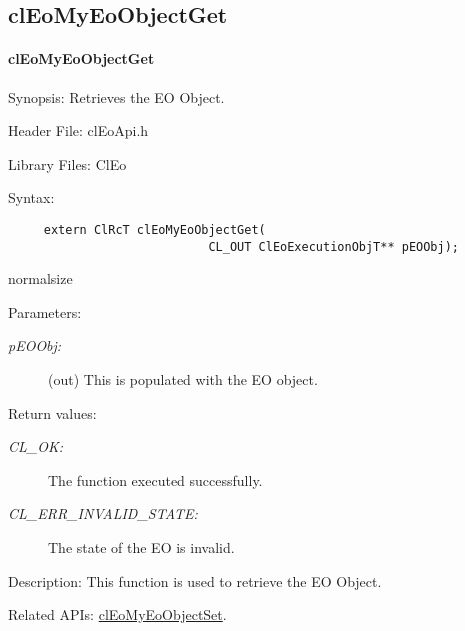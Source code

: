 \begin{flushleft}
  \newpage
\subsection{clEoMyEoObjectGet}
\hypertarget{pageeo119}{}\paragraph{cl\-Eo\-My\-Eo\-Object\-Get}\label{pageeo119}
\begin{Desc}
\item[Synopsis:]Retrieves the EO Object.\end{Desc}
\begin{Desc}
\item[Header File:]clEoApi.h\end{Desc}
\begin{Desc}
\item[Library Files:]Cl\-Eo\end{Desc}
\begin{Desc}
\item[Syntax:]

\footnotesize\begin{verbatim}     extern ClRcT clEoMyEoObjectGet(
                 			CL_OUT ClEoExecutionObjT** pEOObj);
\end{verbatim}
  normalsize
\end{Desc}
\begin{Desc}
\item[Parameters:]
\begin{description}
\item[{\em p\-EOObj:}](out) This is populated with the EO object.\end{description}
\end{Desc}
\begin{Desc}
\item[Return values:]
\begin{description}
\item[{\em CL\_\-OK:}]The function executed successfully. 
\item[{\em CL\_\-ERR\_\-INVALID\_\-STATE:}]The state of the EO is invalid.\end{description}
\end{Desc}
\begin{Desc}
\item[Description:]This function is used to retrieve the EO Object.\end{Desc}
\begin{Desc}
\item[Related APIs:]\hyperlink{pageeo118}{cl\-Eo\-My\-Eo\-Object\-Set}. \end{Desc}








\end{flushleft}

